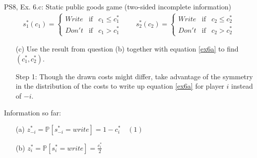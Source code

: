 \begin{frame}{PS8, Ex. 6.c: Static public goods game (two-sided incomplete information)}
    \begin{align*}
      s_1^*(c_1)=\left\{\begin{array}{rcl}
        Write & \text{if} & c_1\leq c_1^*\\
        Don't & \text{if} & c_1>c_1^*
        \end{array}\right.\quad\quad
      s_2^*(c_2)=\left\{\begin{array}{rcl}
        Write & \text{if} & c_2\leq c_2^*\\
        Don't & \text{if} & c_2>c_2^*
        \end{array}\right.
    \end{align*}
    \vspace{-12pt}
    \begin{itemize}
      \item[(c)] Use the result from question (b) together with equation \eqref{ex6a} to find $(c_1^* , c_2^*)$.
    \end{itemize}
    \begin{multicols}{2}
      \begin{itemize}
        \item[Step 1:] Though the drawn costs might differ, take advantage of the symmetry in the distribution of the costs to write up equation \eqref{ex6a} for player $i$ instead of $-i$.
      \end{itemize}
      \vfill\null\columnbreak
      Information so far:
      \begin{enumerate}
        \item[(a)] $z_{-i}^*=\mathbb{P}[s_{-i}^*=write]=1-c_i^*\quad(1)$
        \item[(b)] $z_i^*=\mathbb{P}[s_i^*=write]=\frac{c_i^*}{2}$
      \end{enumerate}
      \vfill\null
    \end{multicols}
\end{frame}
